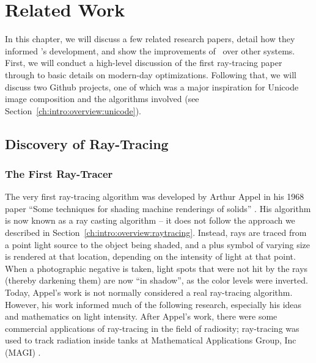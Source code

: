 %
%
\chapter{Related Work}
\label{ch:relatedwork}

In this chapter, we will discuss a few related research papers, detail how they informed \name's development, and show the improvements of \name\ over other systems.
First, we will conduct a high-level discussion of the first ray-tracing paper through to basic details on modern-day optimizations.
Following that, we will discuss two Github projects, one of which was a major inspiration for Unicode image composition and the algorithms involved (see Section~\ref{ch:intro:overview:unicode}).

\section{Discovery of Ray-Tracing}
\label{ch:relatedwork:discovery}

\subsection{The First Ray-Tracer}
\label{ch:relatedwork:discovery:first}

The very first ray-tracing algorithm was developed by Arthur Appel in his 1968 paper ``Some techniques for shading machine renderings of solids'' \cite{appel1968some}.
His algorithm is now known as a ray casting algorithm -- it does not follow the approach we described in Section~\ref{ch:intro:overview:raytracing}.
Instead, rays are traced from a point light source to the object being shaded, and a plus symbol of varying size is rendered at that location, depending on the intensity of light at that point.
When a photographic negative is taken, light spots that were not hit by the rays (thereby darkening them) are now ``in shadow'', as the color levels were inverted.
Today, Appel's work is not normally considered a real ray-tracing algorithm.
However, his work informed much of the following research, especially his ideas and mathematics on light intensity.
After Appel's work, there were some commercial applications of ray-tracing in the field of radiosity; ray-tracing was used to track radiation inside tanks at Mathematical Applications Group, Inc (MAGI) \cite{whitted2018explains}.

